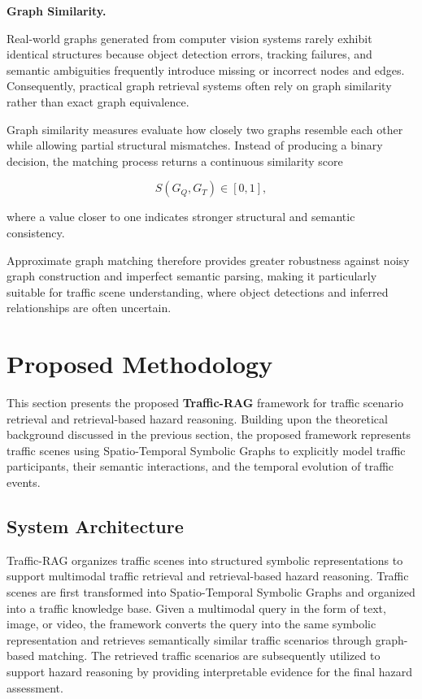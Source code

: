 \documentclass[a4paper, 11pt]{article} %
\begin{document}
\textbf{Graph Similarity.}

Real-world graphs generated from computer vision systems rarely exhibit identical structures because object detection errors, tracking failures, and semantic ambiguities frequently introduce missing or incorrect nodes and edges. Consequently, practical graph retrieval systems often rely on graph similarity rather than exact graph equivalence.

Graph similarity measures evaluate how closely two graphs resemble each other while allowing partial structural mismatches. Instead of producing a binary decision, the matching process returns a continuous similarity score

\[
S(G_Q,G_T)\in[0,1],
\]

where a value closer to one indicates stronger structural and semantic consistency.

Approximate graph matching therefore provides greater robustness against noisy graph construction and imperfect semantic parsing, making it particularly suitable for traffic scene understanding, where object detections and inferred relationships are often uncertain.
\newpage
\section{Proposed Methodology}

This section presents the proposed \textbf{Traffic-RAG} framework for traffic scenario retrieval and retrieval-based hazard reasoning. Building upon the theoretical background discussed in the previous section, the proposed framework represents traffic scenes using Spatio-Temporal Symbolic Graphs to explicitly model traffic participants, their semantic interactions, and the temporal evolution of traffic events.

\subsection{System Architecture}

Traffic-RAG organizes traffic scenes into structured symbolic representations to support multimodal traffic retrieval and retrieval-based hazard reasoning. Traffic scenes are first transformed into Spatio-Temporal Symbolic Graphs and organized into a traffic knowledge base. Given a multimodal query in the form of text, image, or video, the framework converts the query into the same symbolic representation and retrieves semantically similar traffic scenarios through graph-based matching. The retrieved traffic scenarios are subsequently utilized to support hazard reasoning by providing interpretable evidence for the final hazard assessment.
\end{document}
